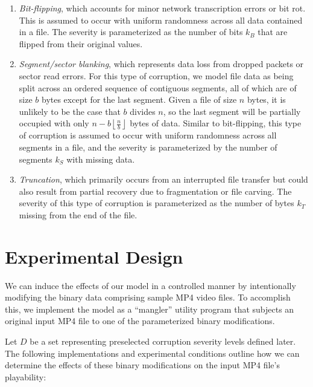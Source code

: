 \begin{enumerate}
    \item \emph{Bit-flipping}, which accounts for minor network transcription errors or bit rot. This is assumed to occur with uniform randomness across all data contained in a file. The severity is parameterized as the number of bits \( k_B \) that are flipped from their original values.
    \item \emph{Segment/sector blanking}, which represents data loss from dropped packets or sector read errors. For this type of corruption, we model file data as being split across an ordered sequence of contiguous segments, all of which are of size \( b \) bytes except for the last segment. Given a file of size \( n \) bytes, it is unlikely to be the case that \( b \) divides \( n \), so the last segment will be partially occupied with only \( n - b \left\lfloor \frac{n}{b} \right\rfloor \) bytes of data. Similar to bit-flipping, this type of corruption is assumed to occur with uniform randomness across all segments in a file, and the severity is parameterized by the number of segments \( k_S \) with missing data.
    \item \emph{Truncation}, which primarily occurs from an interrupted file transfer but could also result from partial recovery due to fragmentation or file carving. The severity of this type of corruption is parameterized as the number of bytes \( k_T \) missing from the end of the file.
\end{enumerate}

\section{Experimental Design}

We can induce the effects of our model in a controlled manner by intentionally modifying the binary data comprising sample MP4 video files. To accomplish this, we implement the model as a ``mangler'' utility program that subjects an original input MP4 file to one of the parameterized binary modifications.

Let \( D \) be a set representing preselected corruption severity levels defined later. The following implementations and experimental conditions outline how we can determine the effects of these binary modifications on the input MP4 file's playability:

